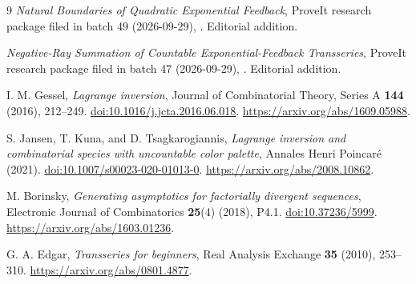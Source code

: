 \documentclass[11pt,a4paper]{article}
\numberwithin{equation}{section}
\theoremstyle{definition}\newtheorem{definition}[theorem]{Definition}
\theoremstyle{remark}\newtheorem{remark}[theorem]{Remark}
\theoremstyle{definition}
\begin{document}
\begin{thebibliography}{9}
\emph{Natural Boundaries of Quadratic Exponential Feedback}, ProveIt research
package filed in batch 49 (2026-09-29),
.
Editorial addition.

\emph{Negative-Ray Summation of Countable Exponential-Feedback Transseries}, ProveIt
research package filed in batch 47 (2026-09-29),
.
Editorial addition.

I. M. Gessel, \emph{Lagrange inversion},
Journal of Combinatorial Theory, Series A \textbf{144} (2016), 212--249.
\href{https://doi.org/10.1016/j.jcta.2016.06.018}{doi:10.1016/j.jcta.2016.06.018}.
\url{https://arxiv.org/abs/1609.05988}.

S. Jansen, T. Kuna, and D. Tsagkarogiannis,
\emph{Lagrange inversion and combinatorial species with uncountable color
palette}, Annales Henri Poincar\'e (2021).
\href{https://doi.org/10.1007/s00023-020-01013-0}{doi:10.1007/s00023-020-01013-0}.
\url{https://arxiv.org/abs/2008.10862}.

M. Borinsky, \emph{Generating asymptotics for factorially divergent
sequences}, Electronic Journal of Combinatorics \textbf{25}(4) (2018), P4.1.
\href{https://doi.org/10.37236/5999}{doi:10.37236/5999}.
\url{https://arxiv.org/abs/1603.01236}.

G. A. Edgar, \emph{Transseries for beginners},
Real Analysis Exchange \textbf{35} (2010), 253--310.
\url{https://arxiv.org/abs/0801.4877}.

\end{thebibliography}
\end{document}
